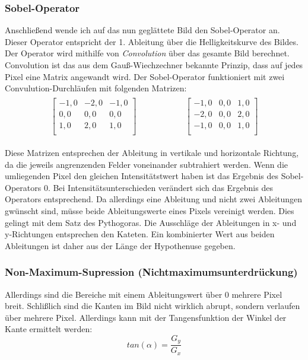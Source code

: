 \subsubsection{Sobel-Operator}
Anschließend wende ich auf das nun geglättete Bild den Sobel-Operator an. Dieser Operator entspricht der 1. Ableitung über die Helligkeitskurve des Bildes. Der Operator wird mithilfe von \textit{Convolution} über das gesamte Bild berechnet. Convolution ist das aus dem Gauß-Wiechzechner bekannte Prinzip, dass auf jedes Pixel eine Matrix angewandt wird. Der Sobel-Operator funktioniert mit zwei Convulution-Durchläufen mit folgenden Matrizen:
\begin{gather}
	\begin{split}
		\begin{bmatrix}
			-1,0&-2,0&-1,0\\
			0,0&0,0&0,0\\
			1,0&2,0&1,0\\
		\end{bmatrix}
	\end{split}
	\hspace{5em}
	\begin{split}
		\begin{bmatrix}
			-1,0&0,0&1,0\\
			-2,0&0,0&2,0\\
			-1,0&0,0&1,0\\
		\end{bmatrix}
	\end{split}
\end{gather}

Diese Matrizen entsprechen der Ableitung in vertikale und horizontale Richtung, da die jeweils angrenzenden Felder voneinander subtrahiert werden. Wenn die umliegenden Pixel den gleichen Intensitätstwert haben ist das Ergebnis des Sobel-Operators 0. Bei Intensitätsunterschieden verändert sich das Ergebnis des Operators entsprechend.
Da allerdings eine Ableitung und nicht zwei Ableitungen gwünscht sind, müsse beide Ableitungswerte eines Pixels vereinigt werden. Dies gelingt mit dem Satz des Pythogoras. Die Ausschläge der Ableitungen in x- und y-Richtungen entsprechen den Kateten. Ein kombinierter Wert aus beiden Ableitungen ist daher aus der Länge der Hypothenuse gegeben.

\subsubsection{Non-Maximum-Supression (Nichtmaximumsunterdrückung)}
Allerdings sind die Bereiche mit einem Ableitungswert über 0 mehrere Pixel breit. Schlißlich sind die Kanten im Bild nicht wirklich abrupt, sondern verlaufen über mehrere Pixel. Allerdings kann mit der Tangensfunktion der Winkel der Kante ermittelt werden:
\begin{equation}
	tan(\alpha) = \frac{G_y}{G_x}
\end{equation}

